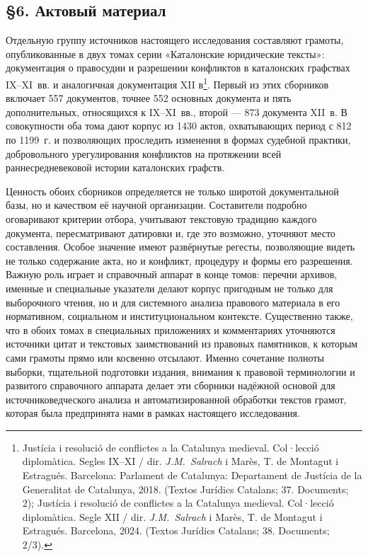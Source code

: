 \subsection*{§6. Актовый материал}

Отдельную группу источников настоящего исследования составляют грамоты, опубликованные в двух томах серии «Каталонские юридические тексты»: документация о правосудии и разрешении конфликтов в каталонских графствах IX--XI~вв. и аналогичная документация XII в\footnote{Justícia i resolució de conflictes a la Catalunya medieval. Col·lecció diplomàtica. Segles IX--XI / dir. \emph{J.M.~Salrach} i Marès, T. de Montagut i Estragués. Barcelona: Parlament de Catalunya: Departament de Justícia de la Generalitat de Catalunya, 2018. (Textos Jurídics Catalans; 37. Documents; 2); Justícia i resolució de conflictes a la Catalunya medieval. Col·lecció diplomàtica. Segle XII / dir. \emph{J.M.~Salrach} i Marès, T. de Montagut i Estragués. Barcelona, 2024. (Textos Jurídics Catalans; 38. Documents; 2/3).}. Первый из этих сборников включает 557 документов, точнее 552 основных документа и пять дополнительных, относящихся к IX--XI~вв., второй --- 873 документа XII~в. В совокупности оба тома дают корпус из 1430 актов, охватывающих период с 812 по 1199~г. и позволяющих проследить изменения в формах судебной практики, добровольного урегулирования конфликтов на протяжении всей раннесредневековой истории каталонских графств.

Ценность обоих сборников определяется не только широтой документальной базы, но и качеством её научной организации. Составители подробно оговаривают критерии отбора, учитывают текстовую традицию каждого документа, пересматривают датировки и, где это возможно, уточняют место составления. Особое значение имеют развёрнутые регесты, позволяющие видеть не только содержание акта, но и конфликт, процедуру и формы его разрешения. Важную роль играет и справочный аппарат в конце томов: перечни архивов, именные и специальные указатели делают корпус пригодным не только для выборочного чтения, но и для системного анализа правового материала в его нормативном, социальном и институциональном контексте. Существенно также, что в обоих томах в специальных приложениях и комментариях уточняются источники цитат и текстовых заимствований из правовых памятников, к которым сами грамоты прямо или косвенно отсылают. Именно сочетание полноты выборки, тщательной подготовки издания, внимания к правовой терминологии и развитого справочного аппарата делает эти сборники надёжной основой для источниковедческого анализа и автоматизированной обработки текстов грамот, которая была предпринята нами в рамках настоящего исследования.

